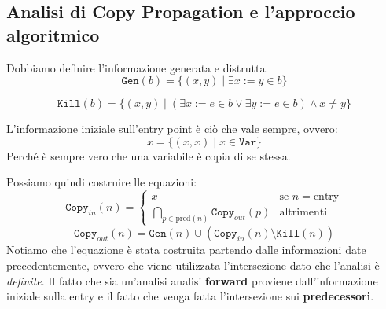 \subsection{Analisi di Copy Propagation e l'approccio algoritmico}
Dobbiamo definire l'informazione generata e distrutta.
\begin{equation}
    \texttt{Gen}(b) = \{(x, y) \mid \exists x := y \in b\}
\end{equation}

\begin{equation}
    \texttt{Kill}(b) = \{(x, y) \mid (\exists x := e \in b \lor \exists y := e \in b) \land x \not = y\}
\end{equation}

L'informazione iniziale sull'entry point è ciò che vale sempre, ovvero:
\[
  x = \{ (x, x) \mid x \in \texttt{Var} \}
\]
Perché è sempre vero che una variabile è copia di se stessa.

Possiamo quindi costruire lle equazioni:
\begin{equation}
    \texttt{Copy}_{in}(n) = 
    \begin{cases}
        x & \text{se } n = \text{entry} \\
        \bigcap_{p \in \text{pred}(n)} \texttt{Copy}_{out}(p) & \text{altrimenti}
    \end{cases}
\end{equation}
\begin{equation}
    \texttt{Copy}_{out}(n) = \texttt{Gen}(n) \cup (\texttt{Copy}_{in}(n) \setminus \texttt{Kill}(n))
\end{equation}
Notiamo che l'equazione è stata costruita partendo dalle informazioni date precedentemente, ovvero che viene
utilizzata l'intersezione dato che l'analisi è \textit{definite}. Il fatto che sia un'analisi analisi
\textbf{forward} proviene dall'informazione iniziale sulla entry 
e il fatto che venga fatta l'intersezione sui \textbf{predecessori}. 

